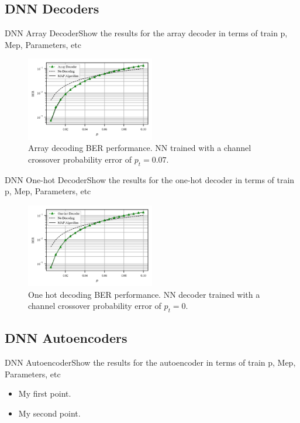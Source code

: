 \documentclass{beamer}
\begin{document}
\subsection{DNN Decoders}
\begin{frame}{DNN Array Decoder}{Show the results for the array decoder in terms of train p, Mep, Parameters, etc}
 
    \begin{figure}[!ht]
  \centering
    \includegraphics[width=0.5\textwidth]{../../Article/images/MLNN_Mep_65536_ptrain_007}
    \caption{Array decoding BER performance. NN trained with a channel crossover probability error of $p_t=0.07$.}\label{fig:ArrayD}
\end{figure}
 
\end{frame}

\begin{frame}{DNN One-hot Decoder}{Show the results for the one-hot decoder in terms of train p, Mep, Parameters, etc}
  
    \begin{figure}[!ht]
  \centering
    \includegraphics[width=0.5\textwidth]{../../Article/images/MLNN1H_Mep_16384_ptrain_0}
    \caption{One hot decoding BER performance. NN decoder trained with a channel crossover probability error of $p_t=0$.}\label{fig:1HD}
\end{figure}

\end{frame}

\subsection{DNN Autoencoders}
\begin{frame}{DNN Autoencoder}{Show the results for the autoencoder in terms of train p, Mep, Parameters, etc}
  \begin{itemize}
  \item {
    My first point.
  }
  \item {
    My second point.
  }
  \end{itemize}
\end{frame}
\end{document}
